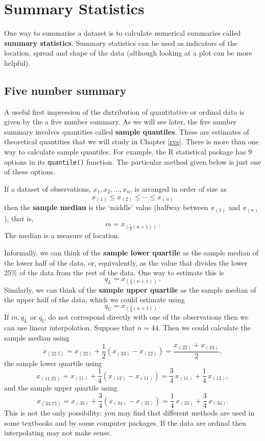 \documentclass[
  11pt,
  british,
  openany, a4paper]{book}
\begin{document}
\hypertarget{summary-statistics}{%
\section{Summary Statistics}\label{summary-statistics}}

One way to summarise a dataset is to calculate numerical summaries called \textbf{summary statistics}. Summary statistics can be used as indicators of the location, spread and shape of the data (although looking at a plot can be more helpful).

\hypertarget{five-number-summary}{%
\subsection{Five number summary}\label{five-number-summary}}

A useful first impression of the distribution of quantitative or ordinal data is given by the a five number summary. As we will see later, the five number summary involves quantities called \textbf{sample quantiles}. These are estimates of theoretical quantities that we will study in Chapter \ref{rvs}. There is more than one way to calculate sample quantiles. For example, the R statistical package has 9 options in its \texttt{quantile()} function. The particular method given below is just one of these options.

If a dataset of observations, \(x_1,x_2,\ldots,x_n\), is arranged in order of size as \[ x_{(1)} \leq x_{(2)} \leq \cdots \leq x_{(n)}\] then the \textbf{sample median} is the `middle' value (halfway between \(x_{(1)}\) and \(x_{(n)}\)), that is,
\[ m=x_{(\frac{1}{2}(n+1))}\,.\]
The median is a measure of location.

Informally, we can think of the \textbf{sample lower quartile} as the sample median of the lower half of the data, or, equivalently, as the value that divides the lower 25\% of the data from the rest of the data. One way to estimate this is
\[ q_L=x_{(\frac{1}{4}(n+1))} \,.\]
Similarly, we can think of the \textbf{sample upper quartile} as the sample median of the upper half of the data, which we could estimate using
\[ q_U=x_{(\frac{3}{4}(n+1))}\,.\]
If \(m, q_L\) or \(q_U\) do not correspond directly with one of the observations
then we can use linear interpolation. Suppose that \(n=44\). Then we could calculate the sample median using
\[x_{(22.5)}=x_{(22)}+\frac12\left(x_{(23)}-
x_{(22)}\right)=\frac{x_{(22)}+x_{(23)}}{2}, \]
the sample lower quartile using
\[ x_{(11.25)}=x_{(11)}+\frac14\left(x_{(12)}-
x_{(11)}\right)=\frac34\,x_{(11)}+\frac14\,x_{(12)}, \]
and the sample upper quartile using
\[x_{(33.75)}=x_{(33)}+\frac34\left(x_{(34)}-
x_{(33)}\right)=\frac14\,x_{(33)}+\frac34\,x_{(34)}.\]
This is not the only possibility: you may find that different methods are used in some textbooks and by some computer packages. If the data are ordinal then interpolating may not make sense.
\end{document}
